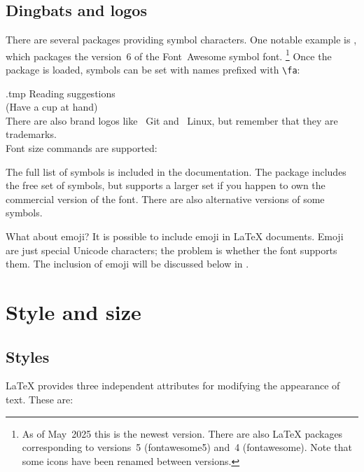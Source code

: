%
%
\subsection{Dingbats and logos}

There are several packages providing symbol characters.
One notable example is ,
which packages the version~6 of the Font~Awesome symbol font.%
\footnote{As of May~2025 this is the newest version.
There are also \LaTeX{} packages corresponding to versions~5 (\textsf{fontawesome5})
and~4 (\textsf{fontawesome}).
Note that some icons have been renamed between versions.
}
Once the package is loaded, symbols can be set with names prefixed with \verb|\fa|:
%
\begin{VerbatimOut}{\jobname.tmp}
\faBook{} Reading suggestions\\
\faMugSaucer{} (Have a cup at hand)\\

There are also brand logos like
\faGit*~Git and \faLinux~Linux,
but remember that they are trademarks.\\

Font size commands are supported:
{\tiny\faPoop}~{\faPoop}~{\Large\faPoop}
\end{VerbatimOut}
\ShowExample
%
The full list of symbols is included in the documentation.
The package includes the free set of symbols,
but supports a larger set if you happen to own the commercial version of the font.
There are also alternative versions of some symbols.


What about emoji?
It is possible to include emoji in \LaTeX{} documents.
Emoji are just special Unicode characters;
the problem is whether the font supports them.
The inclusion of emoji will be discussed below in .


%
%
%
\section{Style and size}\label{sec:font attributes}

\subsection{Styles}
\LaTeX{} provides three independent attributes for modifying the appearance of text.
These are:

